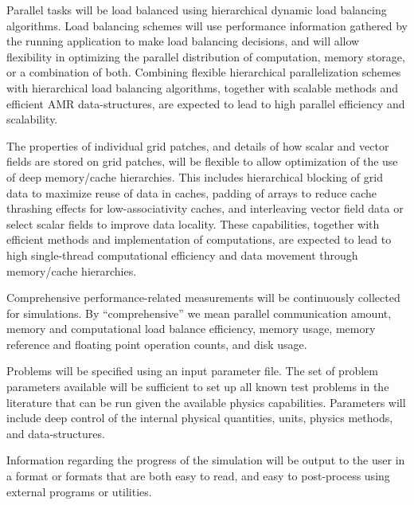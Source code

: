 \documentclass{book}
\begin{document}

   Parallel tasks will be load balanced using hierarchical dynamic
   load balancing algorithms.  Load balancing schemes will use
   performance information gathered by the running application to make
   load balancing decisions, and will allow flexibility in optimizing
   the parallel distribution of computation, memory storage, or a
   combination of both.  Combining flexible hierarchical
   parallelization schemes with hierarchical load balancing
   algorithms, together with scalable methods and efficient AMR
   data-structures, are expected to lead to high parallel efficiency
   and scalability.


   The properties of individual grid patches, and details of how
   scalar and vector fields are stored on grid patches, will be
   flexible to allow optimization of the use of deep memory/cache
   hierarchies.  This includes hierarchical blocking of grid data to 
   maximize reuse of data in caches, padding of arrays to reduce
   cache thrashing effects for low-associativity caches, and interleaving
   vector field data or select scalar fields to improve data locality.
   These capabilities, together with efficient methods and 
   implementation of computations, are expected to lead to high
   single-thread computational efficiency and data movement through
   memory/cache hierarchies.


   Comprehensive performance-related measurements will be continuously
   collected for simulations.  By ``comprehensive'' we mean parallel
   communication amount, memory and computational load balance
   efficiency, memory usage, memory reference and floating point
   operation counts, and disk usage.


   Problems will be specified using an input parameter file.  The set
   of problem parameters available will be sufficient to set up all
   known test problems in the literature that can be run given the
   available physics capabilities.  Parameters will include deep
   control of the internal physical quantities, units, physics
   methods, and data-structures.

   Information regarding the progress of the simulation will be 
   output to the user in a format or formats that are both easy
   to read, and easy to post-process using external programs or
   utilities.
   
\end{document}
